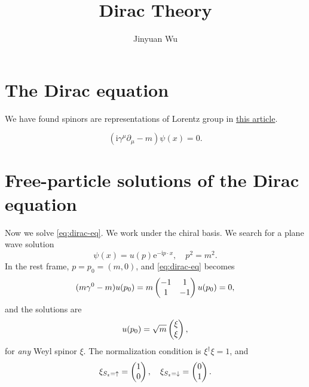 \documentclass[hyperref, a4paper]{article}
\title{Dirac Theory}
\author{Jinyuan Wu}
\newcommand*{\ii}{\mathrm{i}}
\newcommand*{\ee}{\mathrm{e}}
\newcommand{\lorentzrep}{\href{lorentz-rep.pdf}{this article}}
\begin{document}
\maketitle

\section{The Dirac equation}

We have found spinors are representations of Lorentz group in \lorentzrep.

\begin{equation}
    (\ii \gamma^\mu \partial_\mu - m) \psi(x) = 0.
    \label{eq:dirac-eq}
\end{equation}

\section{Free-particle solutions of the Dirac equation}
 
Now we solve \eqref{eq:dirac-eq}. 
We work under the chiral basis. We search for a plane wave solution 
\begin{equation}
    \psi(x) = u(p) \ee^{- \ii p \cdot x}, \quad p^2 = m^2.
\end{equation}
In the rest frame, $p = p_0 = (m, 0)$, and \eqref{eq:dirac-eq} becomes 
\[
    (m \gamma^0 - m) u(p_0) = m \pmqty{-1 & 1 \\ 1 & -1} u(p_0) = 0,
\]
and the solutions are 
\begin{equation}
    u(p_0) = \sqrt{m} \pmqty{\xi \\ \xi}, 
\end{equation}
for \emph{any} Weyl spinor $\xi$. The normalization condition is $\xi^\dagger \xi = 1$, and 
\begin{equation}
    \xi_{S_z = \uparrow} = \pmqty{1 \\ 0}, \quad \xi_{S_z = \downarrow} = \pmqty{0 \\ 1}.
\end{equation}
\end{document}
